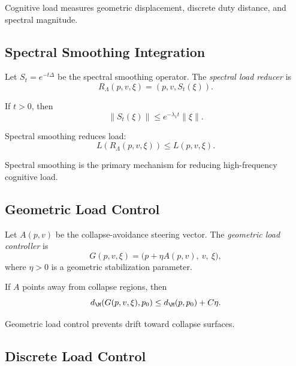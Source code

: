 \begin{remark}
Cognitive load measures geometric displacement, discrete duty distance,
and spectral magnitude.
\end{remark}

\subsection{Spectral Smoothing Integration}

\begin{definition}
Let $S_t = e^{-t\Delta}$ be the spectral smoothing operator.  
The \emph{spectral load reducer} is
\[
R_\Lambda(p,v,\xi)
= (p, v, S_t(\xi)).
\]
\end{definition}

\begin{lemma}
If $t > 0$, then
\[
\| S_t(\xi) \| \le e^{-\lambda_1 t} \|\xi\|.
\]
\end{lemma}

\begin{theorem}
Spectral smoothing reduces load:
\[
L(R_\Lambda(p,v,\xi)) \le L(p,v,\xi).
\]
\end{theorem}

\begin{remark}
Spectral smoothing is the primary mechanism for reducing high-frequency
cognitive load.
\end{remark}

\subsection{Geometric Load Control}

\begin{definition}
Let $A(p,v)$ be the collapse-avoidance steering vector.  
The \emph{geometric load controller} is
\[
G(p,v,\xi)
= \big( p + \eta A(p,v),\ v,\ \xi \big),
\]
where $\eta > 0$ is a geometric stabilization parameter.
\end{definition}

\begin{lemma}
If $A$ points away from collapse regions, then
\[
d_\M(G(p,v,\xi), p_0)
\le d_\M(p,p_0) + C\eta.
\]
\end{lemma}

\begin{remark}
Geometric load control prevents drift toward collapse surfaces.
\end{remark}

\subsection{Discrete Load Control}

